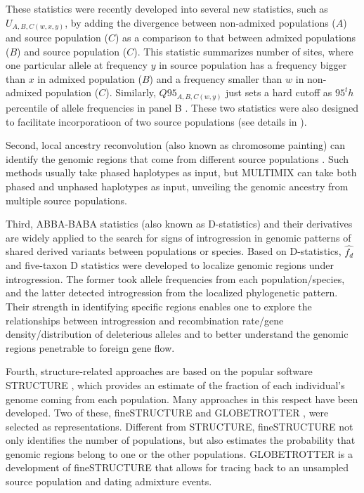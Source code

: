 \documentclass[11pt]{article}
\begin{document}
These statistics were recently developed into several new statistics, such as $U_{A,B,C(w,x,y)}$, by adding the divergence between non-admixed populations ($A$) and source population ($C$) as a comparison to that between admixed populations ($B$) and source population ($C$)\cite{racimo2016}. 
This statistic summarizes number of sites, where one particular allele at frequency $y$ in source population has a frequency bigger than $x$ in admixed population ($B$) and a frequency smaller than $w$ in non-admixed population ($C$).
Similarly, $Q95_{A,B,C(w,y)}$ just sets a hard cutoff as $95^th$ percentile of allele frequencies in panel B \cite{racimo2016}. 
These two statistics were also designed to facilitate incorporatioon of two source populations (see details in \cite{racimo2016}).
 
 
Second, local ancestry reconvolution (also known as chromosome painting) can identify the genomic regions that come from different source populations \cite{schraiber2015}. 
Such methods usually take phased haplotypes as input, but MULTIMIX \cite{churchhouse2013} can take both phased and unphased haplotypes as input, unveiling the genomic ancestry from multiple source populations.


Third, ABBA-BABA statistics (also known as D-statistics) and their derivatives are widely applied to the search for signs of introgression in genomic patterns of shared derived variants between populations or species. 
Based on D-statistics, $\hat{f_{d}}$ \cite{Martin2015} and five-taxon D statistics \cite{pease2015} were developed to localize genomic regions under introgression. 
The former took allele frequencies from each population/species, and the latter detected introgression from the localized phylogenetic pattern.
Their strength in identifying specific regions enables one to explore the relationships between introgression and recombination rate/gene density/distribution of deleterious alleles and to better understand the genomic regions penetrable to foreign gene flow. 

Fourth, structure-related approaches are based on the popular software STRUCTURE \cite{pritchard2000}, which provides an estimate of the fraction of each individual's genome coming from each population. 
Many approaches in this respect have been developed.
Two of these, fineSTRUCTURE \cite{Lawson2012} and GLOBETROTTER \cite{hellenthal2014}, were selected as representations.
Different from STRUCTURE, fineSTRUCTURE not only identifies the number of populations, but also estimates the probability that genomic regions belong to one or the other populations. 
GLOBETROTTER is a development of fineSTRUCTURE that allows for tracing back to an unsampled source population and dating admixture events.
\end{document}
